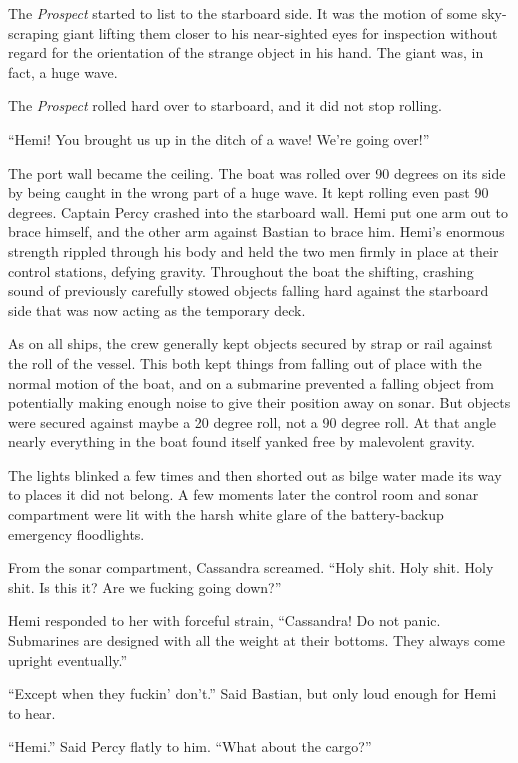 \documentclass[
]{scrbook}
\begin{document}
The \emph{Prospect} started to list to the starboard side. It was the
motion of some sky-scraping giant lifting them closer to his
near-sighted eyes for inspection without regard for the orientation of
the strange object in his hand. The giant was, in fact, a huge wave.

The \emph{Prospect} rolled hard over to starboard, and it did not stop
rolling.

``Hemi! You brought us up in the ditch of a wave! We're going over!''

The port wall became the ceiling. The boat was rolled over 90 degrees on
its side by being caught in the wrong part of a huge wave. It kept
rolling even past 90 degrees. Captain Percy crashed into the starboard
wall. Hemi put one arm out to brace himself, and the other arm against
Bastian to brace him. Hemi's enormous strength rippled through his body
and held the two men firmly in place at their control stations, defying
gravity. Throughout the boat the shifting, crashing sound of previously
carefully stowed objects falling hard against the starboard side that
was now acting as the temporary deck.

As on all ships, the crew generally kept objects secured by strap or
rail against the roll of the vessel. This both kept things from falling
out of place with the normal motion of the boat, and on a submarine
prevented a falling object from potentially making enough noise to give
their position away on sonar. But objects were secured against maybe a
20 degree roll, not a 90 degree roll. At that angle nearly everything in
the boat found itself yanked free by malevolent gravity.

The lights blinked a few times and then shorted out as bilge water made
its way to places it did not belong. A few moments later the control
room and sonar compartment were lit with the harsh white glare of the
battery-backup emergency floodlights.

From the sonar compartment, Cassandra screamed. ``Holy shit. Holy shit.
Holy shit. Is this it? Are we fucking going down?''

Hemi responded to her with forceful strain, ``Cassandra! Do not panic.
Submarines are designed with all the weight at their bottoms. They
always come upright eventually.''

``Except when they fuckin' don't.'' Said Bastian, but only loud enough
for Hemi to hear.

``Hemi.'' Said Percy flatly to him. ``What about the cargo?''
\end{document}
